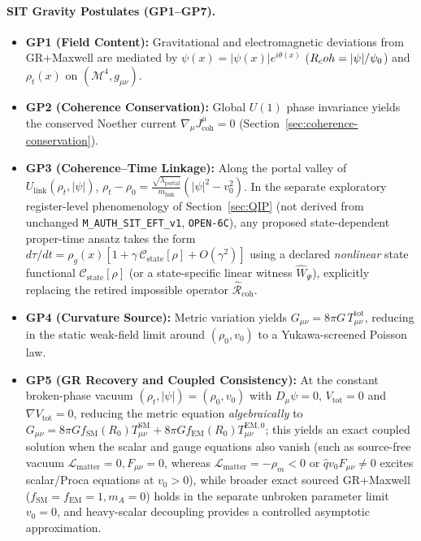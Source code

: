\paragraph{SIT Gravity Postulates (GP1--GP7).}
\begin{itemize}
  \item \textbf{GP1 (Field Content):} Gravitational and electromagnetic deviations from GR+Maxwell are mediated by $\psi(x) = |\psi(x)|e^{i\theta(x)}$ ($R_coh = |\psi|/\psi_0$) and $\rho_t(x)$ on $(\mathcal{M}^4, g_{\mu\nu})$.
  \item \textbf{GP2 (Coherence Conservation):} Global $U(1)$ phase invariance yields the conserved Noether current $\nabla_\mu J^\mu_{\mathrm{coh}} = 0$ (Section~\ref{sec:coherence-conservation}).
  \item \textbf{GP3 (Coherence--Time Linkage):} Along the portal valley of $U_{\mathrm{link}}(\rho_t, |\psi|)$, $\rho_t - \rho_0 = \frac{\sqrt{\lambda_{\mathrm{portal}}}}{m_{\mathrm{link}}}(|\psi|^2 - v_0^2)$. In the separate exploratory register-level phenomenology of Section~\ref{sec:QIP} (not derived from unchanged \texttt{M\_AUTH\_SIT\_EFT\_v1}, \texttt{OPEN-6C}), any proposed state-dependent proper-time ansatz takes the form $d\tau/dt = \rho_g(x)[1 + \gamma\,\mathcal{C}_{\mathrm{state}}[\rho] + O(\gamma^2)]$ using a declared \emph{nonlinear} state functional $\mathcal{C}_{\mathrm{state}}[\rho]$ (or a state-specific linear witness $\hat{W}_\Psi$), explicitly replacing the retired impossible operator $\hat{\mathcal{R}}_{\mathrm{coh}}$.
  \item \textbf{GP4 (Curvature Source):} Metric variation yields $G_{\mu\nu} = 8\pi G\,T_{\mu\nu}^{\mathrm{tot}}$, reducing in the static weak-field limit around $(\rho_0, v_0)$ to a Yukawa-screened Poisson law.
  \item \textbf{GP5 (GR Recovery and Coupled Consistency):} At the constant broken-phase vacuum $(\rho_t, |\psi|) = (\rho_0, v_0)$ with $D_\mu\psi = 0$, $V_{\mathrm{tot}} = 0$ and $\nabla V_{\mathrm{tot}} = 0$, reducing the metric equation \emph{algebraically} to $G_{\mu\nu} = 8\pi G f_{\mathrm{SM}}(R_0) T_{\mu\nu}^{\mathrm{SM}} + 8\pi G f_{\mathrm{EM}}(R_0) T_{\mu\nu}^{\mathrm{EM},0}$; this yields an exact coupled solution when the scalar and gauge equations also vanish (such as source-free vacuum $\mathcal{L}_{\mathrm{matter}} = 0, F_{\mu\nu} = 0$, whereas $\mathcal{L}_{\mathrm{matter}} = -\rho_m < 0$ or $\hat{q}v_0 F_{\mu\nu} \ne 0$ excites scalar/Proca equations at $v_0 > 0$), while broader exact sourced GR+Maxwell ($f_{\mathrm{SM}} = f_{\mathrm{EM}} = 1, m_A = 0$) holds in the separate unbroken parameter limit $v_0 = 0$, and heavy-scalar decoupling provides a controlled asymptotic approximation.

\end{itemize}
